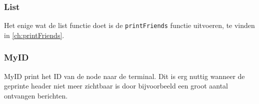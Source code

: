 \subsubsection{List}
Het enige wat de list functie doet is de \texttt{printFriends} functie uitvoeren, te vinden in \autoref{ch:printFriends}.


\subsubsection{MyID}
MyID print het ID van de node naar de terminal. Dit is erg nuttig wanneer de geprinte header niet meer zichtbaar is door bijvoorbeeld een groot aantal ontvangen berichten.
